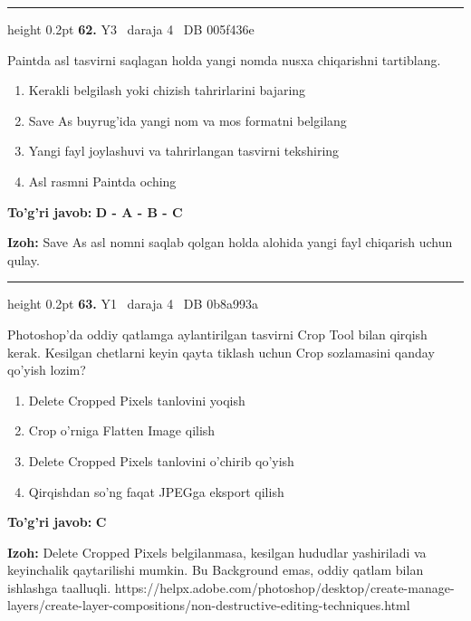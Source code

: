 \documentclass[10pt,a4paper,oneside]{article}
\begin{document}
\vspace{2mm}\hrule height 0.2pt \vspace{4mm}
\hypertarget{q62}{\textbf{\color{ink}62.}}  {\color{muted}\scriptsize Y3 \textbullet\ daraja 4 \textbullet\ DB 005f436e}
\par
Paintda asl tasvirni saqlagan holda yangi nomda nusxa chiqarishni tartiblang.
\begin{enumerate}[label=\Alph*),leftmargin=9mm]
\item Kerakli belgilash yoki chizish tahrirlarini bajaring
\item Save As buyrug'ida yangi nom va mos formatni belgilang
\item Yangi fayl joylashuvi va tahrirlangan tasvirni tekshiring
\item Asl rasmni Paintda oching
\end{enumerate}
\begin{tcolorbox}[enhanced,breakable,colback=teal!4,colframe=teal!45!black,boxrule=0.45pt,arc=1.2mm,left=2.8mm,right=2.8mm,top=2mm,bottom=2mm,before skip=2mm,after skip=2mm]
\textbf{\color{teal}To'g'ri javob:} \textbf{D - A - B - C}
\par\smallskip
\textbf{Izoh:} Save As asl nomni saqlab qolgan holda alohida yangi fayl chiqarish uchun qulay.
\end{tcolorbox}
\vspace{2mm}\hrule height 0.2pt \vspace{4mm}
\hypertarget{q63}{\textbf{\color{ink}63.}}  {\color{muted}\scriptsize Y1 \textbullet\ daraja 4 \textbullet\ DB 0b8a993a}
\par
Photoshop'da oddiy qatlamga aylantirilgan tasvirni Crop Tool bilan qirqish kerak. Kesilgan chetlarni keyin qayta tiklash uchun Crop sozlamasini qanday qo'yish lozim?
\begin{enumerate}[label=\Alph*),leftmargin=9mm]
\item Delete Cropped Pixels tanlovini yoqish
\item Crop o'rniga Flatten Image qilish
\item Delete Cropped Pixels tanlovini o'chirib qo'yish
\item Qirqishdan so'ng faqat JPEGga eksport qilish
\end{enumerate}
\begin{tcolorbox}[enhanced,breakable,colback=teal!4,colframe=teal!45!black,boxrule=0.45pt,arc=1.2mm,left=2.8mm,right=2.8mm,top=2mm,bottom=2mm,before skip=2mm,after skip=2mm]
\textbf{\color{teal}To'g'ri javob:} \textbf{C}
\par\smallskip
\textbf{Izoh:} Delete Cropped Pixels belgilanmasa, kesilgan hududlar yashiriladi va keyinchalik qaytarilishi mumkin. Bu Background emas, oddiy qatlam bilan ishlashga taalluqli. https://helpx.adobe.com/photoshop/desktop/create-manage-layers/create-layer-compositions/non-destructive-editing-techniques.html
\end{tcolorbox}
\end{document}
